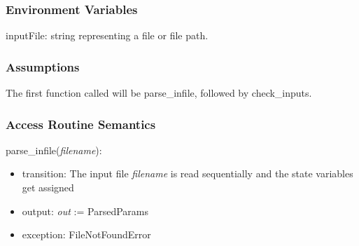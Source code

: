 \documentclass[12pt, titlepage]{article}
\begin{document}
\subsubsection{Environment Variables}

inputFile: string representing a file or file path.\\

\subsubsection{Assumptions}

The first function called will be parse\_infile, followed by check\_inputs.
\subsubsection{Access Routine Semantics}
%

\noindent parse\_infile(\textit{filename}):
\begin{itemize}
	\item transition: The input file \textit{filename} is read sequentially 
	and the state variables get assigned
	\item output: \textit{out} := ParsedParams
	\item exception: FileNotFoundError 
\end{itemize}
\end{document}
